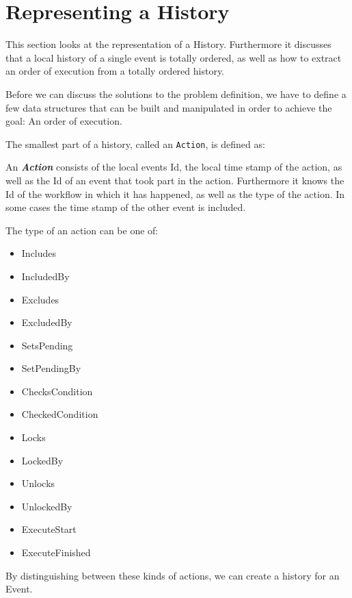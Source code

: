\chapter{Representing a History}\label{chap:representing-a-history}
	This section looks at the representation of a History. Furthermore it discusses that a local history of a single event is totally ordered, as well as how to extract an order of execution from a totally ordered history.

	\newpar Before we can discuss the solutions to the problem definition, we have to define a few data structures that can be built and manipulated in order to achieve the goal: An order of execution.
	
	\newpar The smallest part of a history, called an \texttt{Action}, is defined as:
	
	\newpar
	\begin{definition}
		An \textit{\textbf{Action}} consists of the local events Id, the local time stamp of the action, as well as the Id of an event that took part in the action. Furthermore it knows the Id of the workflow in which it has happened, as well as the type of the action. In some cases the time stamp of the other event is included.
	\end{definition}
	
	\newpar The type of an action can be one of:
	\begin{multicols}{4}
		\begin{itemize}
			\item Includes
			\item IncludedBy
			\item Excludes
			\item ExcludedBy
			\item SetsPending
			\item SetPendingBy
			\item ChecksCondition
			\item CheckedCondition
			\item Locks
			\item LockedBy
			\item Unlocks
			\item UnlockedBy
			\item ExecuteStart
			\item ExecuteFinished
		\end{itemize}
	\end{multicols}
	\noindent By distinguishing between these kinds of actions, we can create a history for an Event.
	
